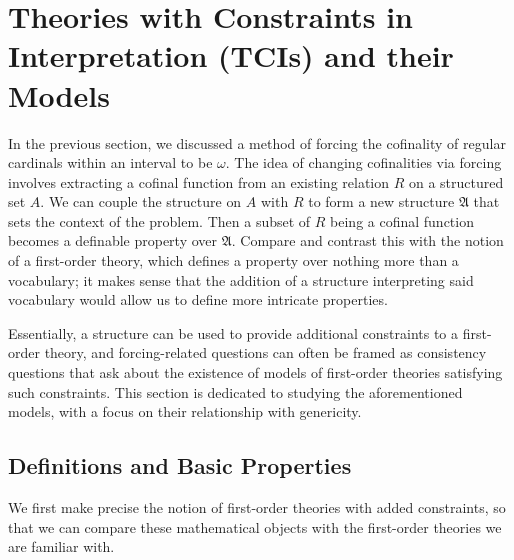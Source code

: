 \documentclass[12pt]{article}
\numberwithin{equation}{section}
\begin{document}
\section{Theories with Constraints in Interpretation (TCIs) and their Models}\label{TCIsec}

In the previous section, we discussed a method of forcing the cofinality of regular cardinals within an interval to be $\omega$. The idea of changing cofinalities via forcing involves extracting a cofinal function from an existing relation $R$ on a structured set $A$. We can couple the structure on $A$ with $R$ to form a new structure $\mathfrak{A}$ that sets the context of the problem. Then a subset of $R$ being a cofinal function becomes a definable property over $\mathfrak{A}$. Compare and contrast this with the notion of a first-order theory, which defines a property over nothing more than a vocabulary; it makes sense that the addition of a structure interpreting said vocabulary would allow us to define more intricate properties. 

Essentially, a structure can be used to provide additional constraints to a first-order theory, and forcing-related questions can often be framed as consistency questions that ask about the existence of models of first-order theories satisfying such constraints. This section is dedicated to studying the aforementioned models, with a focus on their relationship with genericity.

\subsection{Definitions and Basic Properties}\label{subs51}

We first make precise the notion of first-order theories with added constraints, so that we can compare these mathematical objects with the first-order theories we are familiar with. 
\end{document}
